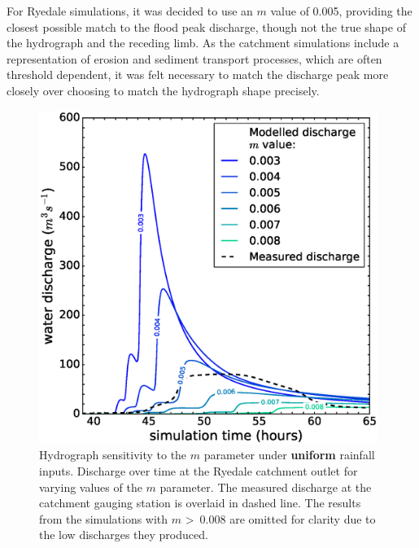 For Ryedale simulations, it was decided to use an \(m\) value of 0.005, providing the closest possible match to the flood peak discharge, though not the true shape of the hydrograph and the receding limb. As the catchment simulations include a representation of erosion and sediment transport processes, which are often threshold dependent, it was felt necessary to match the discharge peak more closely over choosing to match the hydrograph shape precisely.


\begin{figure}[!h]
\includegraphics[width=11cm]{chp_flood_figs_scripts/fig_ryedale_hydro_m_sens_lumped.eps}
\caption{Hydrograph sensitivity to the \(m\) parameter under \textbf{uniform} rainfall inputs. Discharge over time at the Ryedale catchment outlet for varying values of the \(m\) parameter. The measured discharge at the catchment gauging station is overlaid in dashed line. The results from the simulations with \(m\) \textgreater \ 0.008 are omitted for clarity due to the low discharges they produced.}
\label{fig_topmodel_m_ryedale_lumped}
\end{figure}

